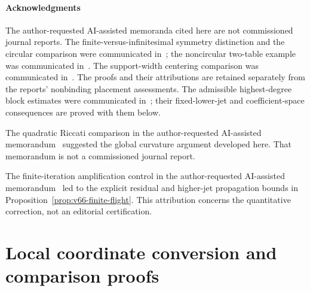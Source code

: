 \subsection*{Acknowledgments}
The author-requested AI-assisted memoranda cited here are not commissioned
journal reports. The finite-versus-infinitesimal symmetry distinction and
the circular comparison were communicated in~\cite{A2ReviewV48}; the
noncircular two-table example was communicated in~\cite{A2ReviewV49}.
The support-width centering comparison was communicated
in~\cite{A2ReviewV51}. The proofs and their attributions are retained
separately from the reports' nonbinding placement assessments.
The admissible highest-degree block estimates were communicated
in~\cite{A2ReviewV57}; their fixed-lower-jet and coefficient-space
consequences are proved with them below.

The quadratic Riccati comparison in the author-requested AI-assisted
memorandum~\cite{A2ReviewV65} suggested the global curvature argument
developed here.  That memorandum is not a commissioned journal report.

The finite-iteration amplification control in the author-requested
AI-assisted memorandum~\cite{A2ReviewV66} led to the explicit residual
and higher-jet propagation bounds in
Proposition~\ref{prop:v66-finite-flight}.  This attribution concerns
the quantitative correction, not an editorial certification.

\appendix
\renewcommand{\thesection}{A.\arabic{section}}
\renewcommand{\theHsection}{principal.appendix.\arabic{section}}
\part{Local coordinate conversion and comparison proofs}






